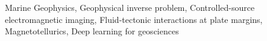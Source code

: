 

\begin{cvparagraph}

Marine Geophysics, Geophysical inverse problem, Controlled-source electromagnetic imaging, Fluid-tectonic interactions at plate margins, Magnetotellurics, Deep learning for geosciences

\end{cvparagraph}
